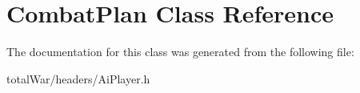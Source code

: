 \hypertarget{class_combat_plan}{}\section{Combat\+Plan Class Reference}
\label{class_combat_plan}


The documentation for this class was generated from the following file\+:\begin{DoxyCompactItemize}
\item 
total\+War/headers/Ai\+Player.\+h\end{DoxyCompactItemize}

